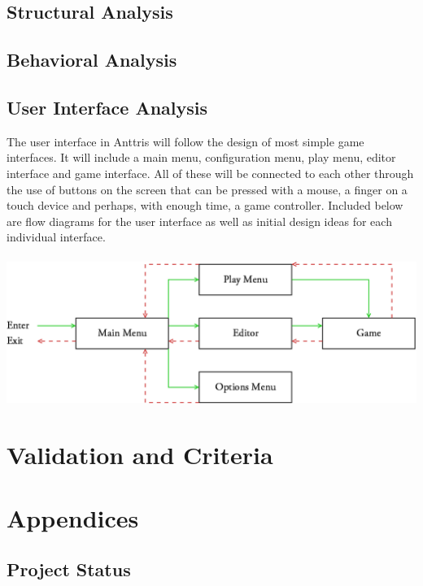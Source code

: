 \documentclass[12pt]{article}
\begin{document}
\subsection{Structural Analysis}\label{struct-analysis-BC}

\subsection{Behavioral Analysis}\label{behavioral-analysis-HR}

\subsection{User Interface Analysis}\label{UI-analysis-CA}
The user interface in Anttris will follow the design of most simple game interfaces. It will include a main menu, configuration menu, play menu, editor interface and game interface. All of these will be connected to each other through the use of buttons on the screen that can be pressed with a mouse, a finger on a touch device and perhaps, with enough time, a game controller. Included below are flow diagrams for the user interface as well as initial design ideas for each individual interface.\\
\\
\includegraphics[width=6in]{UIFlow}

\section{Validation and Criteria}\label{validation-BC}

\section{Appendices}

\subsection{Project Status}\label{status-ST}
\end{document}
